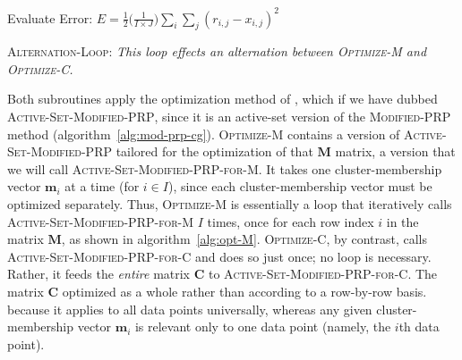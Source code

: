 \begin{algorithm}[th]
 Evaluate Error: $E = \frac{1}{2} \big(\frac{1}{I\times J}\big) \sum_i \sum_j (r_{i,j} - x_{i,j})^2$\;\label{line:init-E} 
\caption{\textsc{Alternation-Loop}: \textit{This loop effects an alternation between \textsc{Optimize-M} and \textsc{Optimize-C}.}}
\label{alg:m-and-c}
\end{algorithm}

Both subroutines apply the 
optimization method of \citet{cheng-and-li:2012}, which if we have 
dubbed \textsc{Active-Set-Modified-PRP}, since it is an active-set version of the 
\textsc{Modified-PRP} method (algorithm~\ref{alg:mod-prp-cg}). 
\textsc{Optimize-M} contains a version of \textsc{Active-Set-Modified-PRP} tailored for
 the optimization of that $\textbf{M}$ matrix, a version that we will call \textsc{Active-Set-Modified-PRP-for-M}.
It takes one cluster-membership vector $\textbf{m}_i$ at a time (for $i \in I$), 
since each cluster-membership vector must be optimized separately. 
Thus, \textsc{Optimize-M} is essentially a loop that iteratively calls 
\textsc{Active-Set-Modified-PRP-for-M} $I$ times, once for each row index $i$ in 
the matrix $\textbf{M}$, as shown in algorithm~\ref{alg:opt-M}.
\textsc{Optimize-C}, by contrast, calls \textsc{Active-Set-Modified-PRP-for-C} and does so just once; no loop is necessary. 
Rather, it feeds the \emph{entire} matrix $\textbf{C}$ to 
\textsc{Active-Set-Modified-PRP-for-C}. The matrix $\textbf{C}$ optimized 
as a whole rather than according to a row-by-row basis.
because it applies to all data points universally, 
whereas any given cluster-membership vector $\textbf{m}_i$ is relevant only to one 
data point (namely, the $i$th data point).

